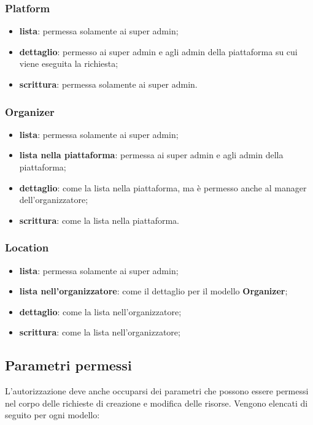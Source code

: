 \subsubsection{Platform}
\begin{itemize}
	\item \textbf{lista}: permessa solamente ai super admin;
	\item \textbf{dettaglio}: permesso ai super admin e agli admin della piattaforma su cui viene eseguita la richiesta;
	\item \textbf{scrittura}: permessa solamente ai super admin.
\end{itemize}

\subsubsection{Organizer}
\begin{itemize}
	\item \textbf{lista}: permessa solamente ai super admin;
	\item \textbf{lista nella piattaforma}: permessa ai super admin e agli admin della piattaforma;
	\item \textbf{dettaglio}: come la lista nella piattaforma, ma è permesso anche al manager dell'organizzatore;
	\item \textbf{scrittura}: come la lista nella piattaforma.
\end{itemize}

\subsubsection{Location}
\begin{itemize}
	\item \textbf{lista}: permessa solamente ai super admin;
	\item \textbf{lista nell'organizzatore}: come il dettaglio per il modello \textbf{Organizer};
	\item \textbf{dettaglio}: come la lista nell'organizzatore;
	\item \textbf{scrittura}: come la lista nell'organizzatore;
\end{itemize}

\subsection{Parametri permessi} \label{api:parametri-permessi}
L'autorizzazione deve anche occuparsi dei parametri che possono essere permessi nel corpo delle richieste di creazione e modifica delle risorse. Vengono elencati di seguito per ogni modello:

